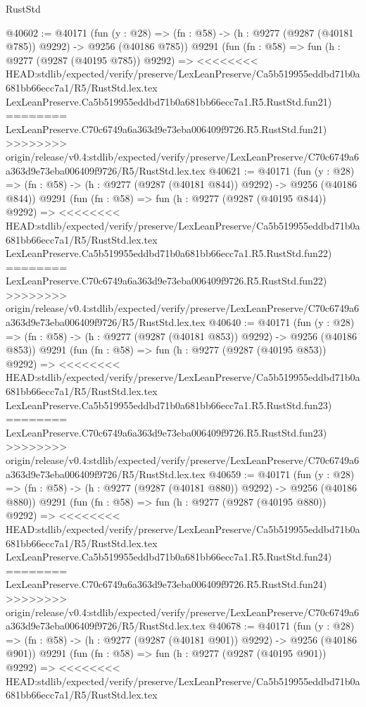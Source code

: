 \begin{lexlean}{RustStd}
\begin{coremodule}
{\begin{coremodule}
{{{{{{{{{{{{{{{{{{{{{{{{{{{{{{{{{{{{{{{{{{{{{{{{{{{{{{{@40602 := @40171
    (fun (y : @28) => (fn : @58) -> (h : @9277 (@9287 (@40181 @785)) @9292) -> @9256 (@40186 @785))
    @9291
    (fun (fn : @58) =>
    fun (h : @9277 (@9287 (@40195 @785)) @9292) =>
<<<<<<<< HEAD:stdlib/expected/verify/preserve/LexLeanPreserve/Ca5b519955eddbd71b0a681bb66ecc7a1/R5/RustStd.lex.tex
    LexLeanPreserve.Ca5b519955eddbd71b0a681bb66ecc7a1.R5.RustStd.fun21)
========
    LexLeanPreserve.C70c6749a6a363d9e73eba006409f9726.R5.RustStd.fun21)
>>>>>>>> origin/release/v0.4:stdlib/expected/verify/preserve/LexLeanPreserve/C70c6749a6a363d9e73eba006409f9726/R5/RustStd.lex.tex
@40621 := @40171
    (fun (y : @28) => (fn : @58) -> (h : @9277 (@9287 (@40181 @844)) @9292) -> @9256 (@40186 @844))
    @9291
    (fun (fn : @58) =>
    fun (h : @9277 (@9287 (@40195 @844)) @9292) =>
<<<<<<<< HEAD:stdlib/expected/verify/preserve/LexLeanPreserve/Ca5b519955eddbd71b0a681bb66ecc7a1/R5/RustStd.lex.tex
    LexLeanPreserve.Ca5b519955eddbd71b0a681bb66ecc7a1.R5.RustStd.fun22)
========
    LexLeanPreserve.C70c6749a6a363d9e73eba006409f9726.R5.RustStd.fun22)
>>>>>>>> origin/release/v0.4:stdlib/expected/verify/preserve/LexLeanPreserve/C70c6749a6a363d9e73eba006409f9726/R5/RustStd.lex.tex
@40640 := @40171
    (fun (y : @28) => (fn : @58) -> (h : @9277 (@9287 (@40181 @853)) @9292) -> @9256 (@40186 @853))
    @9291
    (fun (fn : @58) =>
    fun (h : @9277 (@9287 (@40195 @853)) @9292) =>
<<<<<<<< HEAD:stdlib/expected/verify/preserve/LexLeanPreserve/Ca5b519955eddbd71b0a681bb66ecc7a1/R5/RustStd.lex.tex
    LexLeanPreserve.Ca5b519955eddbd71b0a681bb66ecc7a1.R5.RustStd.fun23)
========
    LexLeanPreserve.C70c6749a6a363d9e73eba006409f9726.R5.RustStd.fun23)
>>>>>>>> origin/release/v0.4:stdlib/expected/verify/preserve/LexLeanPreserve/C70c6749a6a363d9e73eba006409f9726/R5/RustStd.lex.tex
@40659 := @40171
    (fun (y : @28) => (fn : @58) -> (h : @9277 (@9287 (@40181 @880)) @9292) -> @9256 (@40186 @880))
    @9291
    (fun (fn : @58) =>
    fun (h : @9277 (@9287 (@40195 @880)) @9292) =>
<<<<<<<< HEAD:stdlib/expected/verify/preserve/LexLeanPreserve/Ca5b519955eddbd71b0a681bb66ecc7a1/R5/RustStd.lex.tex
    LexLeanPreserve.Ca5b519955eddbd71b0a681bb66ecc7a1.R5.RustStd.fun24)
========
    LexLeanPreserve.C70c6749a6a363d9e73eba006409f9726.R5.RustStd.fun24)
>>>>>>>> origin/release/v0.4:stdlib/expected/verify/preserve/LexLeanPreserve/C70c6749a6a363d9e73eba006409f9726/R5/RustStd.lex.tex
@40678 := @40171
    (fun (y : @28) => (fn : @58) -> (h : @9277 (@9287 (@40181 @901)) @9292) -> @9256 (@40186 @901))
    @9291
    (fun (fn : @58) =>
    fun (h : @9277 (@9287 (@40195 @901)) @9292) =>
<<<<<<<< HEAD:stdlib/expected/verify/preserve/LexLeanPreserve/Ca5b519955eddbd71b0a681bb66ecc7a1/R5/RustStd.lex.tex
}}}}}}}}}}}}}}}}}}}}}}}}}}}}}}}}}}}}}}}}}}}}}}}}}}}}}}}
\end{coremodule}}
\end{coremodule}
\end{lexlean}

